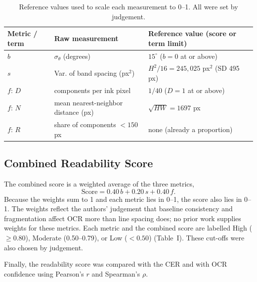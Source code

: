 \begin{table}[t]
  \centering
  \caption{Reference values used to scale each measurement to 0--1. All were
  set by judgement.}
  \label{tab:reference}
  \begin{tabular}{@{}lll@{}}
    \toprule
    Metric / term & Raw measurement & Reference value (score or term limit) \\
    \midrule
    $b$ & $\sigma_\theta$ (degrees) & $15^\circ$ ($b = 0$ at or above) \\
    $s$ & Var. of band spacing (px$^2$) & $H^2/16 = 245{,}025$ px$^2$ (SD 495 px) \\
    $f$: $D$ & components per ink pixel & $1/40$ ($D = 1$ at or above) \\
    $f$: $N$ & mean nearest-neighbor distance (px) & $\sqrt{HW} = 1697$ px \\
    $f$: $R$ & share of components $<150$ px & none (already a proportion) \\
    \bottomrule
  \end{tabular}
\end{table}


\subsection{Combined Readability Score}

The combined score is a weighted average of the three metrics,
\[ \text{Score} = 0.40\,b + 0.20\,s + 0.40\,f. \]
Because the weights sum to 1 and each metric lies in 0--1, the score also lies
in 0--1. The weights reflect the authors' judgement that baseline consistency
and fragmentation affect OCR more than line spacing does; no prior work
supplies weights for these metrics. Each metric and the combined score are
labelled High ($\geq 0.80$), Moderate (0.50--0.79), or Low ($< 0.50$)
(Table~I). These cut-offs were also chosen by judgement.


Finally, the readability score was compared with the CER and with OCR
confidence using Pearson's $r$ and Spearman's $\rho$.

